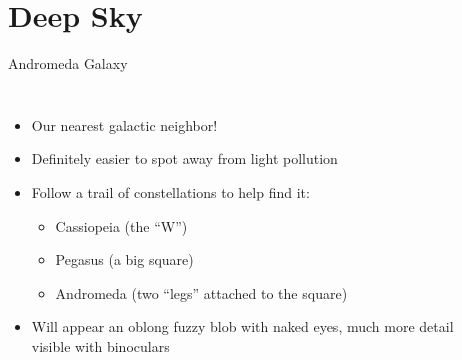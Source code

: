\documentclass[pdf, ]{beamer}
\begin{document}
\section{Deep Sky}

\begin{frame}{Andromeda Galaxy}
	\begin{columns}
		\begin{itemize}
			\item Our nearest galactic neighbor!
			\item Definitely easier to spot away from light pollution
			\item Follow a trail of constellations to help find it:
				\begin{itemize}
					\item Cassiopeia (the ``W'')
					\item Pegasus (a big square)
					\item Andromeda (two ``legs'' attached to the square)
				\end{itemize}
			\item Will appear an oblong fuzzy blob with naked eyes, much more detail visible with binoculars
		\end{itemize}
		
		\begin{center}
			\vspace{-5mm}
\end{center}
\end{columns}
\end{frame}
\end{document}
